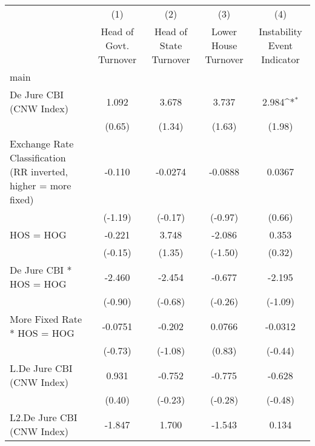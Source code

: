 {
\def\sym#1{\ifmmode^{#1}\else\(^{#1}\)\fi}
\begin{longtable}{l*{4}{c}}
\toprule\endfirsthead\midrule\endhead\midrule\endfoot\endlastfoot
                &\multicolumn{1}{c}{(1)}&\multicolumn{1}{c}{(2)}&\multicolumn{1}{c}{(3)}&\multicolumn{1}{c}{(4)}\\
                &\multicolumn{1}{c}{Head of Govt. Turnover}&\multicolumn{1}{c}{Head of State Turnover}&\multicolumn{1}{c}{Lower House Turnover}&\multicolumn{1}{c}{Instability Event Indicator}\\
\midrule
main            &                  &                  &                  &                  \\
De Jure CBI (CNW Index)&    1.092         &    3.678         &    3.737         &    2.984\sym{*}  \\
                &   (0.65)         &   (1.34)         &   (1.63)         &   (1.98)         \\
\addlinespace
Exchange Rate Classification (RR inverted, higher = more fixed)&   -0.110         &  -0.0274         &  -0.0888         &   0.0367         \\
                &  (-1.19)         &  (-0.17)         &  (-0.97)         &   (0.66)         \\
\addlinespace
HOS = HOG       &   -0.221         &    3.748         &   -2.086         &    0.353         \\
                &  (-0.15)         &   (1.35)         &  (-1.50)         &   (0.32)         \\
\addlinespace
De Jure CBI * HOS = HOG&   -2.460         &   -2.454         &   -0.677         &   -2.195         \\
                &  (-0.90)         &  (-0.68)         &  (-0.26)         &  (-1.09)         \\
\addlinespace
More Fixed Rate * HOS = HOG&  -0.0751         &   -0.202         &   0.0766         &  -0.0312         \\
                &  (-0.73)         &  (-1.08)         &   (0.83)         &  (-0.44)         \\
\addlinespace
L.De Jure CBI (CNW Index)&    0.931         &   -0.752         &   -0.775         &   -0.628         \\
                &   (0.40)         &  (-0.23)         &  (-0.28)         &  (-0.48)         \\
\addlinespace
L2.De Jure CBI (CNW Index)&   -1.847         &    1.700         &   -1.543         &    0.134         \\

\end{longtable}}
